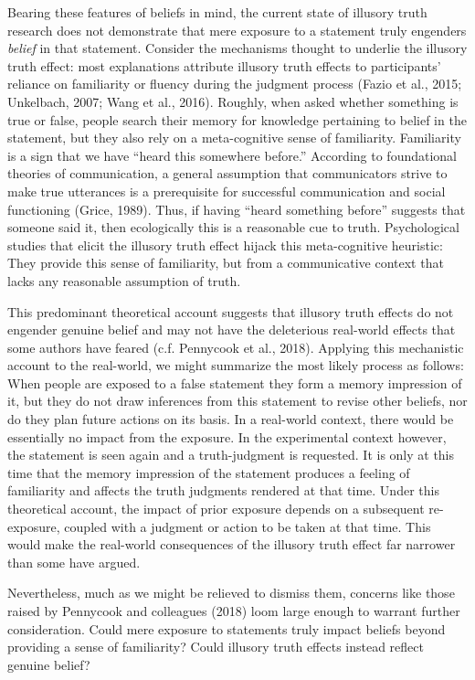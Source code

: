 \documentclass[10pt, letterpaper]{article}
\begin{document}
Bearing these features of beliefs in mind, the current state of illusory
truth research does not demonstrate that mere exposure to a statement
truly engenders \emph{belief} in that statement. Consider the mechanisms
thought to underlie the illusory truth effect: most explanations
attribute illusory truth effects to participants' reliance on
familiarity or fluency during the judgment process (Fazio et al., 2015;
Unkelbach, 2007; Wang et al., 2016). Roughly, when asked whether
something is true or false, people search their memory for knowledge
pertaining to belief in the statement, but they also rely on a
meta-cognitive sense of familiarity. Familiarity is a sign that we have
``heard this somewhere before.'' According to foundational theories of
communication, a general assumption that communicators strive to make
true utterances is a prerequisite for successful communication and
social functioning (Grice, 1989). Thus, if having ``heard something
before'' suggests that someone said it, then ecologically this is a
reasonable cue to truth. Psychological studies that elicit the illusory
truth effect hijack this meta-cognitive heuristic: They provide this
sense of familiarity, but from a communicative context that lacks any
reasonable assumption of truth.

This predominant theoretical account suggests that illusory truth
effects do not engender genuine belief and may not have the deleterious
real-world effects that some authors have feared (c.f. Pennycook et al.,
2018). Applying this mechanistic account to the real-world, we might
summarize the most likely process as follows: When people are exposed to
a false statement they form a memory impression of it, but they do not
draw inferences from this statement to revise other beliefs, nor do they
plan future actions on its basis. In a real-world context, there would
be essentially no impact from the exposure. In the experimental context
however, the statement is seen again and a truth-judgment is requested.
It is only at this time that the memory impression of the statement
produces a feeling of familiarity and affects the truth judgments
rendered at that time. Under this theoretical account, the impact of
prior exposure depends on a subsequent re-exposure, coupled with a
judgment or action to be taken at that time. This would make the
real-world consequences of the illusory truth effect far narrower than
some have argued.

Nevertheless, much as we might be relieved to dismiss them, concerns
like those raised by Pennycook and colleagues (2018) loom large enough
to warrant further consideration. Could mere exposure to statements
truly impact beliefs beyond providing a sense of familiarity? Could
illusory truth effects instead reflect genuine belief?
\end{document}
